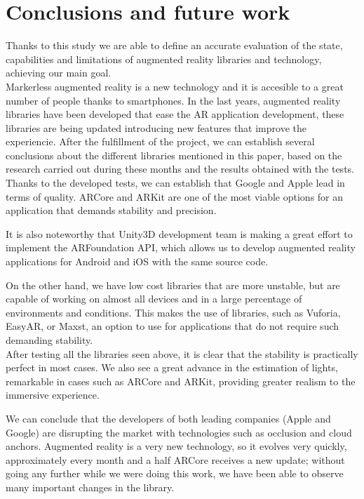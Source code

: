 \setcounter{chapter}{5}
\chapter{Conclusions and future work}

Thanks to this study we are able to define an accurate evaluation of the state, capabilities and limitations of augmented reality libraries and technology, achieving our main goal.\\

Markerless augmented reality is a new technology and it is accesible to a great number of people thanks to smartphones. In the last years, augmented reality libraries have been developed that ease the AR application development, these libraries are being updated introducing new features that improve the experiencie.
 After the fulfillment of the project, we can establish several conclusions about the different
libraries mentioned in this paper, based on the research carried out during these months and
the results obtained with the tests.\\

Thanks to the developed tests, we can establish that Google and Apple lead in terms of quality. ARCore and ARKit are one of the most viable options for an application that demands stability and precision. 

It is also noteworthy that Unity3D development team is making a great effort to implement the ARFoundation API, which allows us to develop augmented reality applications for Android and iOS with the same source code.

On the other hand, we have low cost libraries that are more unstable, but are capable of working on almost all devices\cite{wikitudeInstant} and in a large percentage of environments and conditions. This makes the use of libraries, such as Vuforia, EasyAR, or Maxst, an option to use for applications that do not require such demanding stability. \\

After testing all the libraries seen above, it is clear that the stability is practically perfect in most cases. We also see a great advance in the estimation of lights, remarkable in cases such as ARCore and ARKit, providing greater realism to the immersive experience. 

We can conclude that the developers of both leading companies (Apple and Google) are disrupting the market with technologies such as occlusion and cloud anchors. Augmented reality is a very new technology, so it evolves very quickly, approximately every month and a half ARCore receives a new update; without going any further while we were doing this work, we have been able to observe many important changes in the library. \\

